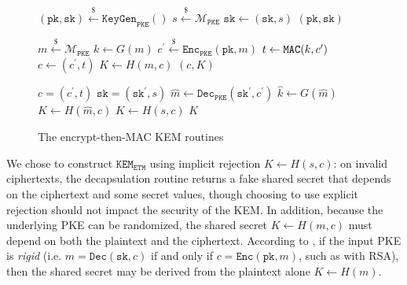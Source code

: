 \documentclass[letterpaper,12pt,titlepage,oneside,final]{book}
\newcommand{\pke}{\texttt{PKE}}
\newcommand{\keygen}{\texttt{KeyGen}}
\newcommand{\encrypt}{\texttt{Enc}}
\newcommand{\decrypt}{\texttt{Dec}}
\newcommand{\kem}{\texttt{KEM}}
\newcommand{\encap}{\texttt{Encap}}
\newcommand{\decap}{\texttt{Decap}}
\newcommand{\etm}{{\texttt{ETM}}}  %
\newcommand{\mac}{\texttt{\texttt{MAC}}}
\newcommand{\pk}{\texttt{pk}}
\newcommand{\sk}{\texttt{sk}}
\newcommand{\leftsample}{\stackrel{\$}{\leftarrow}}
\begin{document}
\begin{figure}[htbp]
    \centering
    \begin{minipage}[t]{0.32\textwidth}
    \begin{algorithm}[H]
        \caption*{$\keygen_\etm()$}
        \begin{algorithmic}[1]
            \State $(\pk,  \sk) \leftsample \keygen_\pke()$
            \State $s \leftsample \mathcal{M}_\pke$
            \State $\sk \leftarrow (\sk, s)$
            \State \Return $(\pk, \sk)$
        \end{algorithmic}
    \end{algorithm}
    \end{minipage}\hfill
    \begin{minipage}[t]{0.3\textwidth}
    \begin{algorithm}[H]
        \caption*{$\encap_\etm(\pk)$}
        \begin{algorithmic}[1]
            \State $m \leftsample \mathcal{M}_\pke$
            \State $k \leftarrow G(m)$
            \State $c^\prime \leftsample \encrypt_\pke(\pk, m)$
            \State $t \leftarrow \mac(k, c^\prime)$
            \State $c \leftarrow (c^\prime, t)$
            \State $K \leftarrow H(m, c)$
            \State \Return $(c, K)$
        \end{algorithmic}
    \end{algorithm}
    \end{minipage}\hfill
    \begin{minipage}[t]{0.33\textwidth}
    \begin{algorithm}[H]
        \caption*{$\decap_\etm(\sk, c)$}
        \begin{algorithmic}[1]
            \Require $c = (c^\prime, t)$
            \Require $\sk = (\sk^\prime, s)$
            \State $\hat{m} \leftarrow \decrypt_\pke(\sk^\prime, c^\prime)$
            \State $\hat{k} \leftarrow G(\hat{m})$
            \If{$\mac(\hat{k}, c^\prime) = t$}
                \State $K \leftarrow H(\hat{m}, c)$
            \Else 
                \State $K \leftarrow H(s, c)$
            \EndIf
            \State \Return $K$
        \end{algorithmic}
    \end{algorithm}
    \end{minipage}
    \caption{The encrypt-then-MAC KEM routines}\label{fig:etm-routines}
\end{figure}

We chose to construct $\kem_\etm$ using implicit rejection $K \leftarrow H(s, c)$: on invalid ciphertexts, the decapsulation routine returns a fake shared secret that depends on the ciphertext and some secret values, though choosing to use explicit rejection should not impact the security of the KEM. In addition, because the underlying PKE can be randomized, the shared secret $K \leftarrow H(m, c)$ must depend on both the plaintext and the ciphertext. According to \cite{DBLP:conf/ima/Dent03,DBLP:conf/tcc/HofheinzHK17}, if the input PKE is \textit{rigid} (i.e. $m = \decrypt(\sk, c)$ if and only if $c = \encrypt(\pk, m)$, such as with RSA), then the shared secret may be derived from the plaintext alone $K \leftarrow H(m)$.
\end{document}
